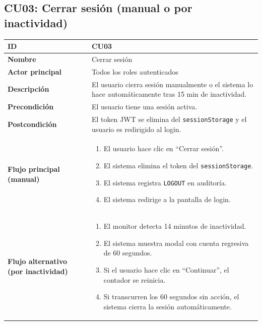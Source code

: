 \documentclass[11pt,a4paper]{article}
\begin{document}
\subsection*{CU03: Cerrar sesión (manual o por inactividad)}
\begin{longtable}{|L{3.5cm}|L{10cm}|}
    \hline
    \textbf{ID}                                  & CU03                                                                                                  \\ \hline
    \textbf{Nombre}                              & Cerrar sesión                                                                                         \\ \hline
    \textbf{Actor principal}                     & Todos los roles autenticados                                                                          \\ \hline
    \textbf{Descripción}                         & El usuario cierra sesión manualmente o el sistema lo hace automáticamente tras 15 min de inactividad. \\ \hline
    \textbf{Precondición}                        & El usuario tiene una sesión activa.                                                                   \\ \hline
    \textbf{Postcondición}                       & El token JWT se elimina del \texttt{sessionStorage} y el usuario es redirigido al login.              \\ \hline
    \textbf{Flujo principal (manual)}            &
    \begin{enumerate}
        \item El usuario hace clic en ``Cerrar sesión''.
        \item El sistema elimina el token del \texttt{sessionStorage}.
        \item El sistema registra \texttt{LOGOUT} en auditoría.
        \item El sistema redirige a la pantalla de login.
    \end{enumerate}                                                                                    \\ \hline
    \textbf{Flujo alternativo (por inactividad)} &
    \begin{enumerate}
        \item El monitor detecta 14 minutos de inactividad.
        \item El sistema muestra modal con cuenta regresiva de 60 segundos.
        \item Si el usuario hace clic en ``Continuar'', el contador se reinicia.
        \item Si transcurren los 60 segundos sin acción, el sistema cierra la sesión automáticamente.
    \end{enumerate}                                                     \\ \hline
\end{longtable}
\end{document}
